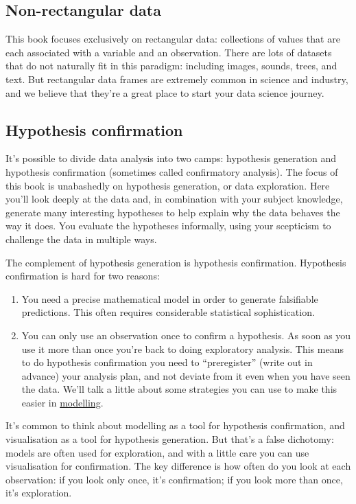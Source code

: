 \documentclass[]{book}
\begin{document}
\subsection{Non-rectangular data}\label{non-rectangular-data}

This book focuses exclusively on rectangular data: collections of values
that are each associated with a variable and an observation. There are
lots of datasets that do not naturally fit in this paradigm: including
images, sounds, trees, and text. But rectangular data frames are
extremely common in science and industry, and we believe that they're a
great place to start your data science journey.

\subsection{Hypothesis confirmation}\label{hypothesis-confirmation}

It's possible to divide data analysis into two camps: hypothesis
generation and hypothesis confirmation (sometimes called confirmatory
analysis). The focus of this book is unabashedly on hypothesis
generation, or data exploration. Here you'll look deeply at the data
and, in combination with your subject knowledge, generate many
interesting hypotheses to help explain why the data behaves the way it
does. You evaluate the hypotheses informally, using your scepticism to
challenge the data in multiple ways.

The complement of hypothesis generation is hypothesis confirmation.
Hypothesis confirmation is hard for two reasons:

\begin{enumerate}
\def\labelenumi{\arabic{enumi}.}
\item
  You need a precise mathematical model in order to generate falsifiable
  predictions. This often requires considerable statistical
  sophistication.
\item
  You can only use an observation once to confirm a hypothesis. As soon
  as you use it more than once you're back to doing exploratory
  analysis. This means to do hypothesis confirmation you need to
  ``preregister'' (write out in advance) your analysis plan, and not
  deviate from it even when you have seen the data. We'll talk a little
  about some strategies you can use to make this easier in
  \protect\hyperlink{model-intro}{modelling}.
\end{enumerate}

It's common to think about modelling as a tool for hypothesis
confirmation, and visualisation as a tool for hypothesis generation. But
that's a false dichotomy: models are often used for exploration, and
with a little care you can use visualisation for confirmation. The key
difference is how often do you look at each observation: if you look
only once, it's confirmation; if you look more than once, it's
exploration.
\end{document}
